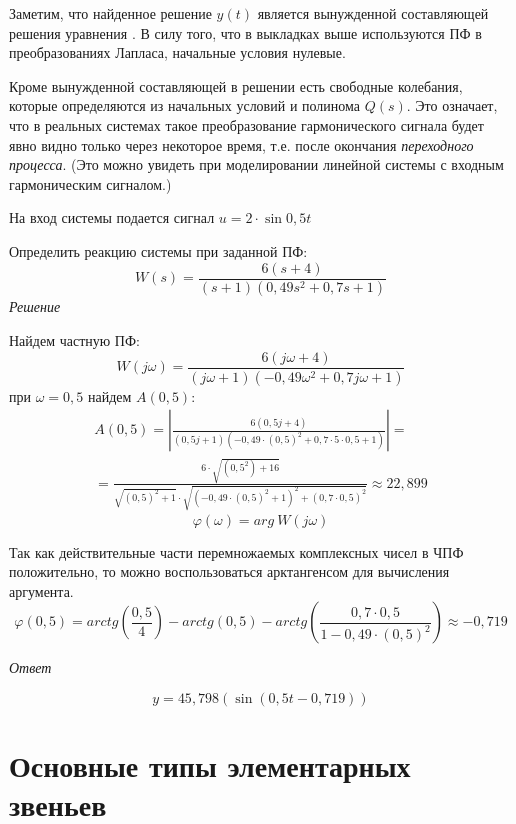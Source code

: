 \documentclass[../../TAU.tex]{subfiles}
\begin{document}
    Заметим, что найденное решение $y(t)$ является вынужденной составляющей решения уравнения .  В силу того, что в выкладках выше используются ПФ в преобразованиях Лапласа, начальные условия нулевые.

    Кроме вынужденной составляющей в решении есть свободные колебания, которые определяются из начальных условий и полинома $Q(s)$. Это означает, что в реальных системах такое преобразование гармонического сигнала будет явно видно только через некоторое время, т.е. после окончания {\it переходного процесса}. (Это можно увидеть при моделировании линейной системы с входным гармоническим сигналом.)

    \examp На вход системы подается сигнал  $u=2\cdot\sin{0{,}5t}$

    Определить реакцию системы при заданной ПФ:
    \[
        W(s)=\frac{6(s+4)}{(s+1)(0{,}49s^2+0,7s+1)}    
    \]
    \textit{Решение}

    Найдем частную ПФ:
    \[
        W(j\omega)=\frac{6(j\omega+4)}{(j\omega+1)(-0{,}49\omega^2+0{,}7j\omega+1)}
    \]
    при $\omega=0{,}5$ найдем $A(0{,}5)$:
    \begin{multline*}
        A(0{,}5)=\left|\frac{6(0{,}5j+4)}{(0{,}5j+1)(-0{,}49\cdot(0{,}5)^2+0{,}7\cdot5\cdot0{,}5+1)}\right|= \\
        =\frac{6\cdot\sqrt{(0{,}5^2)+16}}{\sqrt{(0{,}5)^2+1}\cdot\sqrt{(-0{,}49\cdot(0{,}5)^2+1)^2+(0{,}7\cdot0{,}5)^2}}\approx22{,}899
    \end{multline*}
    \[
        \varphi(\omega)=arg\ W(j\omega)
    \]

    Так как действительные части перемножаемых комплексных чисел в ЧПФ положительно, то можно воспользоваться арктангенсом для вычисления аргумента.  
    \[
        \varphi(0{,}5)=arctg\left(\frac{0{,}5}{4}\right)-arctg(0{,}5)-arctg\left(\frac{0{,}7\cdot0{,}5}{1-0{,}49\cdot(0{,}5)^2}\right)\approx-0{,}719
    \]

    \textit{Ответ}

    \[
        y=45{,}798(\sin(0{,}5t-0{,}719))
    \]

\section{Основные типы элементарных звеньев} 
\end{document}

